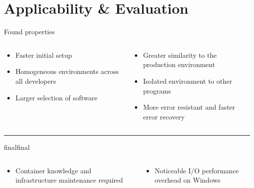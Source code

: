 \documentclass{beamer}
\def\final{final}
\def\status{final}
\begin{document}
\section{Applicability \& Evaluation}
\begin{frame}{}
  \vspace{-.5cm}
  \begin{center}
    \Large Found properties
  \end{center}
  \begin{columns}
    \begin{column}{0.5\textwidth}
      \begin{itemize}
        \setlength\itemsep{0.6em}
        \item Faster initial setup
        \item Homogeneous environments across all developers
        \item Larger selection of software
      \end{itemize}
    \end{column}
    \begin{column}{0.5\textwidth}
      \begin{itemize}
        \setlength\itemsep{0.6em}
        \item Greater similarity to the production environment
        \item Isolated environment to other programs
        \item More error resistant and faster error recovery
      \end{itemize}
    \end{column}
  \end{columns}

  \vspace{.5cm}
  {\color{uos-red-full}\rule{\textwidth}{1.5pt}}

  \ifx\status\final{}
    \pause{}
  \fi


  \begin{columns}
    \begin{column}{0.5\textwidth}
      \begin{itemize}
        \setlength\itemsep{0.6em}
        \item Container knowledge and infrastructure maintenance required
      \end{itemize}
    \end{column}
    \begin{column}{0.5\textwidth}
      \begin{itemize}
        \setlength\itemsep{0.6em}
        \item Noticeable I/O performance overhead on Windows
      \end{itemize}
    \end{column}
  \end{columns}
\end{frame}
\end{document}
